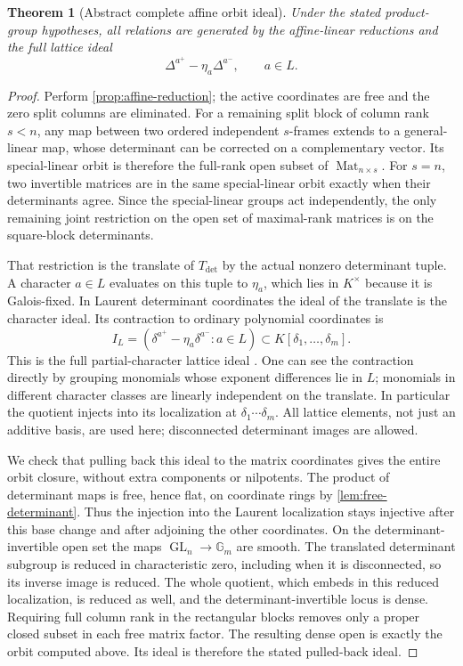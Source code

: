 \documentclass[11pt]{article}
\numberwithin{equation}{section}
\newtheorem{theorem}{Theorem}[section]
\theoremstyle{definition}
\theoremstyle{remark}
\newcommand{\Gm}{\mathbb G_m}
\newcommand{\GL}{\operatorname{GL}}
\begin{document}
\begin{theorem}[Abstract complete affine orbit ideal]\label{thm:orbit}
Under the stated product-group hypotheses, all relations are generated by
the affine-linear reductions and the full lattice ideal
\[
 \Delta^{a^+}-\eta_a\Delta^{a^-},\qquad a\in L.
\]
\end{theorem}
\begin{proof}
Perform \cref{prop:affine-reduction}; the active coordinates are
free and the zero split columns are eliminated. For a remaining split
block of column rank $s<n$, any map between two ordered independent
$s$-frames extends to a general-linear map, whose determinant can be
corrected on a complementary vector. Its special-linear orbit is
therefore the full-rank open subset of $\operatorname{Mat}_{n\times s}$.
For $s=n$, two invertible matrices are in the same special-linear orbit
exactly when their determinants agree. Since the special-linear groups
act independently, the only remaining joint restriction on the open
set of maximal-rank matrices is on the square-block determinants.

That restriction is the translate of $T_{\det}$ by the actual
nonzero determinant tuple. A character $a\in L$ evaluates on this
tuple to $\eta_a$, which lies in $K^\times$ because it is Galois-fixed.
In Laurent determinant coordinates the ideal of the translate is the
character ideal. Its contraction to ordinary polynomial coordinates is
\[
 I_L=(\delta^{a^+}-\eta_a\delta^{a^-}:a\in L)
       \subset K[\delta_1,\ldots,\delta_m].
\]
This is the full partial-character lattice ideal
\cite{EisenbudSturmfels}. One can see the contraction directly by
grouping monomials whose exponent differences lie in $L$; monomials in
different character classes are linearly independent on the translate.
In particular the quotient injects into its localization at
$\delta_1\cdots\delta_m$. All lattice elements, not just an additive
basis, are used here; disconnected determinant images are allowed.

We check that pulling back this ideal to the matrix coordinates gives
the entire orbit closure, without extra components or nilpotents.
The product of determinant maps is free, hence flat, on coordinate
rings by \cref{lem:free-determinant}. Thus the injection into the
Laurent localization stays injective after this base change and after
adjoining the other coordinates. On the determinant-invertible open
set the maps $\GL_n\to\Gm$ are smooth. The translated determinant
subgroup is reduced in characteristic zero, including when it is
disconnected, so its inverse image is reduced. The whole quotient,
which embeds in this reduced localization, is reduced as well, and
the determinant-invertible locus is dense. Requiring full column rank
in the rectangular blocks removes only a proper closed subset in each
free matrix factor. The resulting dense open is exactly the orbit
computed above. Its ideal is therefore the stated pulled-back ideal.


\end{proof}
\end{document}
